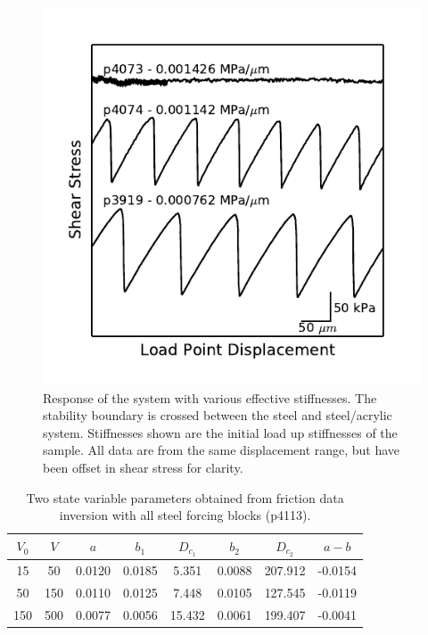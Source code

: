 \begin{figure}
\begin{centering}
\includegraphics{chap_granular_stiffness/Fig12.pdf}
\caption{\label{fig:transition}
Response of the system with various effective stiffnesses.  The stability
boundary is crossed between the steel and steel/acrylic system.  Stiffnesses
shown are the initial load up stiffnesses of the sample.  All data are from the
same displacement range, but have been offset in shear stress for clarity. }
\end{centering}
\end{figure}

\clearpage

\begin{table}
\begin{center}
\begin{tabular}{cccccccc}
$V_0$ & $V$ & $a$ & $b_1$ & $D_{c_1}$ & $b_2$ & $D_{c_2}$ & $a-b$ \\
\hline
\hline
15&50&0.0120&0.0185&5.351&0.0088&207.912&-0.0154\\
50&150&0.0110&0.0125&7.448&0.0105&127.545&-0.0119\\
150&500&0.0077&0.0056&15.432&0.0061&199.407&-0.0041\\
\hline
\end{tabular}
\end{center}
\caption{Two state variable parameters obtained from friction data inversion with all steel forcing blocks (p4113).}
\label{rsf_params}
\end{table}


